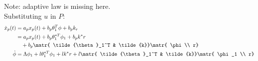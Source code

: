 Note: adaptive law is missing here.\\
Substituting $u$ in $P $:
\begin{alignat*}{3}
\dot{x}_p(t)
    &= a_p x_p(t) + b_p \theta_1^T \phi + b_p k_r\\
    &= a_p x_p(t) + b_p \theta_1^{*T} \phi_1 + b_p k^* r\\
    & \quad + b_p \matr{ \tilde{\theta}_1^T & \tilde{k}}
        \matr{ \phi \\ r}\\
\dot{\phi} &= \Lambda \phi_1 + l \theta_1^{*T} \phi_1
    + lk^*r + l \matr{ \tilde{\theta}_1^T & \tilde{k}} \matr{ \phi_1 \\ r}
\end{alignat*}

